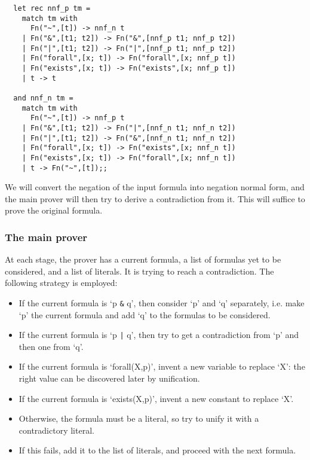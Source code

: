 \begin{boxed}\begin{verbatim}
  let rec nnf_p tm =
    match tm with
      Fn("~",[t]) -> nnf_n t
    | Fn("&",[t1; t2]) -> Fn("&",[nnf_p t1; nnf_p t2])
    | Fn("|",[t1; t2]) -> Fn("|",[nnf_p t1; nnf_p t2])
    | Fn("forall",[x; t]) -> Fn("forall",[x; nnf_p t])
    | Fn("exists",[x; t]) -> Fn("exists",[x; nnf_p t])
    | t -> t

  and nnf_n tm =
    match tm with
      Fn("~",[t]) -> nnf_p t
    | Fn("&",[t1; t2]) -> Fn("|",[nnf_n t1; nnf_n t2])
    | Fn("|",[t1; t2]) -> Fn("&",[nnf_n t1; nnf_n t2])
    | Fn("forall",[x; t]) -> Fn("exists",[x; nnf_n t])
    | Fn("exists",[x; t]) -> Fn("forall",[x; nnf_n t])
    | t -> Fn("~",[t]);;
\end{verbatim}\end{boxed}

We will convert the negation of the input formula into negation normal form,
and the main prover will then try to derive a contradiction from it. This will
suffice to prove the original formula.

\subsubsection*{The main prover}

At each stage, the prover has a current formula, a list of formulas yet to be
considered, and a list of literals. It is trying to reach a contradiction. The
following strategy is employed:

\begin{itemize}

\item If the current formula is `p {\verb+&+} q', then consider
`p' and `q' separately, i.e. make `p' the current formula and add
`q' to the formulas to be considered.

\item If the current formula is `p {\verb+|+} q', then try to get a
contradiction from `p' and then one from `q'.

\item If the current formula is `forall(X,p)', invent a new variable to
replace `X': the right value can be discovered later by unification.

\item If the current formula is `exists(X,p)', invent a new constant to
replace `X'.

\item Otherwise, the formula must be a literal, so try to unify it with a
contradictory literal.

\item If this fails, add it to the list of literals, and proceed with the next
formula.

\end{itemize}

